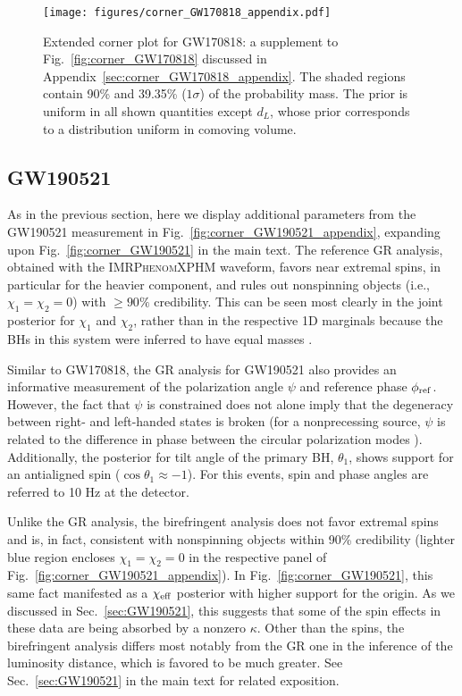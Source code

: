 \documentclass[aps,prd,twocolumn,superscriptaddress,preprintnumbers,floatfix,nofootinbib]{revtex4-2}
\begin{document}
\begin{figure*}[h]
    \texttt{[image: figures/corner\_GW170818\_appendix.pdf]}
    \caption{
        Extended corner plot for GW170818: a supplement to Fig.~\ref{fig:corner_GW170818} discussed in Appendix~\ref{sec:corner_GW170818_appendix}. The shaded regions contain 90\% and 39.35\% ($1\sigma$) of the probability mass.
        The prior is uniform in all shown quantities except $d_L$, whose prior corresponds to a distribution uniform in comoving volume.
    }
    \label{fig:corner_GW170818_appendix}
\end{figure*}

\subsection{GW190521}
\label{sec:corner_GW190521_appendix}

As in the previous section, here we display additional parameters from the GW190521 measurement in Fig.~\ref{fig:corner_GW190521_appendix}, expanding upon Fig.~\ref{fig:corner_GW190521} in the main text.
The reference \ac{GR} analysis, obtained with the \textsc{IMRPhenomXPHM} waveform, favors near extremal spins, in particular for the heavier component, and rules out nonspinning objects (i.e., $\chi_1 = \chi_2 = 0$) with $\geq 90\%$ credibility.
This can be seen most clearly in the joint posterior for $\chi_1$ and $\chi_2$, rather than in the respective 1D marginals because the \acp{BH} in this system were inferred to have equal masses \cite{Biscoveanu:2020are}.

Similar to GW170818, the \ac{GR} analysis for GW190521 also provides an informative measurement of the polarization angle $\psi$ and reference phase $\phi_{\rm ref}$.
However, the fact that $\psi$ is constrained does not alone imply that the degeneracy between right- and left-handed states is broken (for a nonprecessing source, $\psi$ is related to the difference in phase between the circular polarization modes \cite{Isi:2022mbx}).
Additionally, the posterior for tilt angle of the primary \ac{BH}, $\theta_1$, shows support for an antialigned spin ($\cos\theta_1 \approx -1$).
For this events, spin and phase angles are referred to 10 Hz at the detector.

Unlike the \ac{GR} analysis, the birefringent analysis does not favor extremal spins and is, in fact, consistent with nonspinning objects within 90\% credibility (lighter blue region encloses $\chi_1 = \chi_2 = 0$ in the respective panel of Fig.~\ref{fig:corner_GW190521_appendix}).
In Fig.~\ref{fig:corner_GW190521}, this same fact manifested as a $\chi_{\rm eff}$ posterior with higher support for the origin.
As we discussed in Sec.~\ref{sec:GW190521}, this suggests that some of the spin effects in these data are being absorbed by a nonzero $\kappa$.
Other than the spins, the birefringent analysis differs most notably from the \ac{GR} one in the inference of the luminosity distance, which is favored to be much greater.
See Sec.~\ref{sec:GW190521} in the main text for related exposition.
\end{document}

